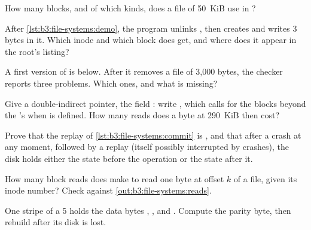 \begin{exercise}[$\star$]\label{exo:b3:file-systems:3}
How many blocks, and of which kinds, does a file of 50~KiB use in ?
\end{exercise}

\begin{exercise}[$\star$]\label{exo:b3:file-systems:4}
After \cref{lst:b3:file-systems:demo}, the program unlinks , then creates  and writes 3 bytes in it. Which inode and which block does  get, and where does it appear in the root's listing?
\end{exercise}

\begin{exercise}[$\star\star$]\label{exo:b3:file-systems:5}
A first version of  is below. After it removes a file of 3,000 bytes, the checker reports three problems. Which ones, and what is missing?

\label{lst:b3:file-systems:unlinkbug}
\end{exercise}

\begin{exercise}[$\star\star$]\label{exo:b3:file-systems:6}
Give  a double-indirect pointer, the field : write , which  calls for the blocks beyond the 's when  is defined. How many reads does a byte at 290~KiB then cost?
\end{exercise}

\begin{exercise}[$\star\star$]\label{exo:b3:file-systems:7}
Prove that the replay of \cref{lst:b3:file-systems:commit} is , and that after a crash at any moment, followed by a replay (itself possibly interrupted by crashes), the disk holds either the state before the operation or the state after it.
\end{exercise}

\begin{exercise}[$\star\star$]\label{exo:b3:file-systems:8}
How many block reads does  make to read one byte at offset $k$ of a  file, given its inode number? Check against \cref{out:b3:file-systems:reads}.
\end{exercise}

\begin{exercise}[$\star\star$]\label{exo:b3:file-systems:9}
One stripe of a  5 holds the data bytes , ,  and . Compute the parity byte, then rebuild  after its disk is lost.
\end{exercise}

